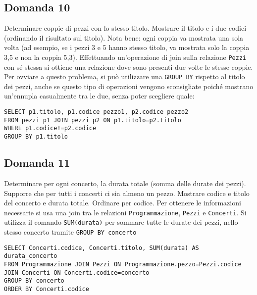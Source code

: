 \documentclass{article}
\numberwithin{equation}{subsection}
\begin{document}
\subsection*{Domanda 10}
Determinare coppie di pezzi con lo stesso titolo. Mostrare il titolo e i due codici (ordinando il risultato sul titolo). Nota bene: ogni coppia va mostrata una sola volta 
(ad esempio, se i pezzi 3 e 5 hanno stesso titolo, va mostrata solo la coppia 3,5 e non la coppia 5,3). Effettuando un'operazione di join sulla relazione \verb|Pezzi| con sé stessa si ottiene una relazione dove sono 
presenti due volte le stesse coppie. Per ovviare a questo problema, si può utilizzare una \verb|GROUP BY| rispetto al titolo dei pezzi, anche se questo tipo di operazioni vengono sconsigliate poiché mostrano 
un'ennupla casualmente tra le due, senza poter scegliere quale:
\begin{verbatim}
SELECT p1.titolo, p1.codice pezzo1, p2.codice pezzo2
FROM pezzi p1 JOIN pezzi p2 ON p1.titolo=p2.titolo
WHERE p1.codice!=p2.codice
GROUP BY p1.titolo
\end{verbatim}

\subsection*{Domanda 11}
Determinare per ogni concerto, la durata totale (somma delle durate dei pezzi). Supporre che per tutti i concerti ci sia almeno un pezzo. Mostrare codice e titolo del concerto e durata totale. Ordinare per codice. 
Per ottenere le informazioni necessarie si usa una join tra le relazioni \verb|Programmazione|, \verb|Pezzi| e \verb|Concerti|. Si utilizza il comando \verb|SUM(durata)| per sommare tutte le durate dei pezzi, nello 
stesso concerto tramite \verb|GROUP BY concerto|  
\begin{verbatim}
SELECT Concerti.codice, Concerti.titolo, SUM(durata) AS durata_concerto
FROM Programmazione JOIN Pezzi ON Programmazione.pezzo=Pezzi.codice
JOIN Concerti ON Concerti.codice=concerto
GROUP BY concerto
ORDER BY Concerti.codice
\end{verbatim}
\end{document}
